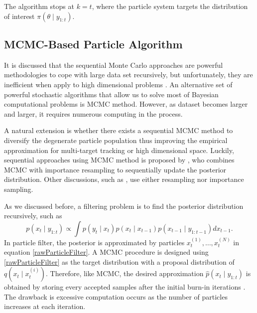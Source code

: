 The algorithm stops at $k=t$, where the particle system targets the distribution of interest $\pi(\theta\mid y_{1:t})$. 


\subsection{MCMC-Based Particle Algorithm}

It is discussed that the sequential Monte Carlo approaches are powerful methodologies to cope with large data set recursively, but unfortunately, they are inefficient when apply to high dimensional problems \citep{septier2009mcmc}.  An alternative set of powerful stochastic algorithms that allow us to solve most of Bayesian computational problems is MCMC method. However, as dataset becomes larger and larger, it requires numerous computing in the process. 

A natural extension is whether there exists a sequential MCMC method to diversify the degenerate particle population thus improving the empirical approximation for multi-target tracking or high dimensional space. Luckily, sequential approaches using MCMC method is proposed by \cite{berzuini1997dynamic}, who combines MCMC with importance resampling to sequentially update the posterior distribution. 
Other discussions, such as \citep{khan2005mcmc, golightly2006bayesian, pang2008models}, use either resampling nor importance sampling. 

As we discussed before, a filtering problem is to find the posterior distribution recursively, such as  
\begin{equation}
p(x_t\mid y_{1:t}) \propto \int p(y_t\mid x_t)p(x_t\mid x_{t-1})p(x_{t-1}\mid y_{1:t-1})dx_{t-1}. 
\end{equation} 
In particle filter, the posterior is approximated by particles $x_t^{(1)},\ldots,x_t^{(N)}$ in equation \eqref{rawParticleFilter}. A MCMC procedure is designed using \eqref{rawParticleFilter} as the target distribution with a proposal distribution of $q\left(x_t\mid x_t^{(i)}\right)$. Therefore, like MCMC, the desired approximation $\hat{p}(x_t\mid y_{1:t})$ is obtained by storing every accepted samples after the initial burn-in iterations \citep{septier2009mcmc}. The drawback is excessive computation occurs as the number of particles increases at each iteration. 

